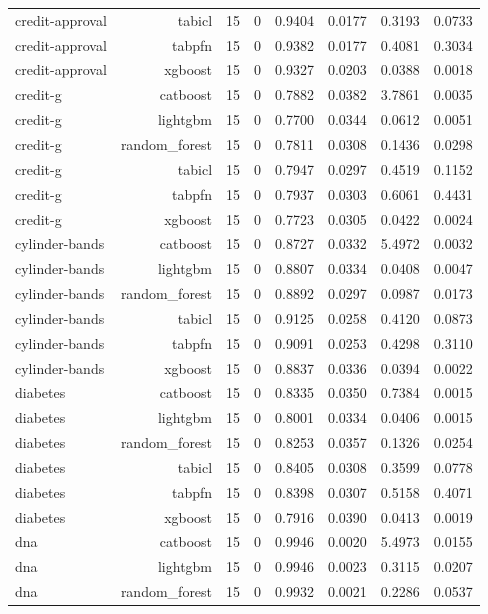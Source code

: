 \begin{table}[htbp]
\begin{tabular}{lrrrrrrr}
credit-approval & tabicl & 15 & 0 & 0.9404 & 0.0177 & 0.3193 & 0.0733 \\
credit-approval & tabpfn & 15 & 0 & 0.9382 & 0.0177 & 0.4081 & 0.3034 \\
credit-approval & xgboost & 15 & 0 & 0.9327 & 0.0203 & 0.0388 & 0.0018 \\
credit-g & catboost & 15 & 0 & 0.7882 & 0.0382 & 3.7861 & 0.0035 \\
credit-g & lightgbm & 15 & 0 & 0.7700 & 0.0344 & 0.0612 & 0.0051 \\
credit-g & random\_forest & 15 & 0 & 0.7811 & 0.0308 & 0.1436 & 0.0298 \\
credit-g & tabicl & 15 & 0 & 0.7947 & 0.0297 & 0.4519 & 0.1152 \\
credit-g & tabpfn & 15 & 0 & 0.7937 & 0.0303 & 0.6061 & 0.4431 \\
credit-g & xgboost & 15 & 0 & 0.7723 & 0.0305 & 0.0422 & 0.0024 \\
cylinder-bands & catboost & 15 & 0 & 0.8727 & 0.0332 & 5.4972 & 0.0032 \\
cylinder-bands & lightgbm & 15 & 0 & 0.8807 & 0.0334 & 0.0408 & 0.0047 \\
cylinder-bands & random\_forest & 15 & 0 & 0.8892 & 0.0297 & 0.0987 & 0.0173 \\
cylinder-bands & tabicl & 15 & 0 & 0.9125 & 0.0258 & 0.4120 & 0.0873 \\
cylinder-bands & tabpfn & 15 & 0 & 0.9091 & 0.0253 & 0.4298 & 0.3110 \\
cylinder-bands & xgboost & 15 & 0 & 0.8837 & 0.0336 & 0.0394 & 0.0022 \\
diabetes & catboost & 15 & 0 & 0.8335 & 0.0350 & 0.7384 & 0.0015 \\
diabetes & lightgbm & 15 & 0 & 0.8001 & 0.0334 & 0.0406 & 0.0015 \\
diabetes & random\_forest & 15 & 0 & 0.8253 & 0.0357 & 0.1326 & 0.0254 \\
diabetes & tabicl & 15 & 0 & 0.8405 & 0.0308 & 0.3599 & 0.0778 \\
diabetes & tabpfn & 15 & 0 & 0.8398 & 0.0307 & 0.5158 & 0.4071 \\
diabetes & xgboost & 15 & 0 & 0.7916 & 0.0390 & 0.0413 & 0.0019 \\
dna & catboost & 15 & 0 & 0.9946 & 0.0020 & 5.4973 & 0.0155 \\
dna & lightgbm & 15 & 0 & 0.9946 & 0.0023 & 0.3115 & 0.0207 \\
dna & random\_forest & 15 & 0 & 0.9932 & 0.0021 & 0.2286 & 0.0537 \\

\end{tabular}
\end{table}
